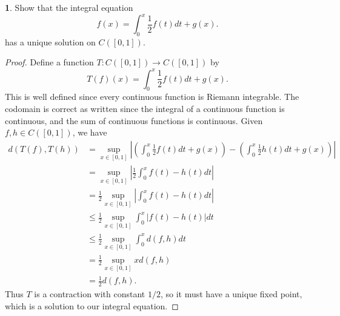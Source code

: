 \documentclass[12pt]{article}
\theoremstyle{definition}
\newtheorem{ex}{}
\begin{document}
\begin{ex}
	Show that the integral equation \begin{equation*}
		f(x) = \int_0^x \frac{1}{2}f(t) dt + g(x).
	\end{equation*}
	has a unique solution on $C([0, 1])$.
\end{ex}
\begin{proof}
	Define a function $T: C([0, 1]) \to C([0, 1])$ by \begin{equation*}
		T(f)(x) = \int_0^x \frac{1}{2}f(t) dt + g(x).
	\end{equation*}
	This is well defined since every continuous function is Riemann integrable.
	The codomain is correct as written since the integral of a continuous function is continuous, and the sum of continuous functions is continuous.
	Given $f, h \in C([0,1])$, we have \begin{align*}
		d(T(f), T(h)) & = \sup_{x \in [0, 1]} \left| \left(\int_0^x \frac{1}{2}f(t)dt + g(x)\right) - \left( \int_0^x \frac{1}{2}h(t)dt + g(x) \right) \right| \\
		              & = \sup_{x \in [0, 1]} \left| \frac{1}{2}\int_0^x f(t) - h(t)dt \right|                                                                 \\
		              & = \frac{1}{2}\sup_{x \in [0, 1]} \left| \int_0^x f(t) - h(t)dt \right|                                                                 \\
		              & \leq \frac{1}{2}\sup_{x \in [0, 1]} \int_0^x \left| f(t) - h(t) \right|dt                                                                 \\
                  & \leq \frac{1}{2}\sup_{x \in [0, 1]} \int_0^x d(f, h) dt                                                                 \\
                  & = \frac{1}{2}\sup_{x \in [0, 1]} xd(f, h) \\
                  & = \frac{1}{2} d(f, h).
	\end{align*}
  Thus $T$ is a contraction with constant $1/2$, so it must have a unique fixed point, which is a solution to our integral equation.
\end{proof}
\end{document}
